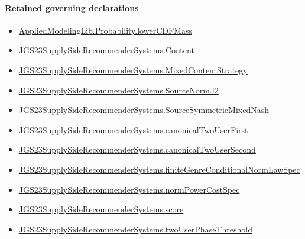\documentclass[10pt]{article}
\begin{document}
\paragraph{Retained governing declarations}
\begin{itemize}\raggedright
\item \hyperlink{governing-declaration-5dfc240c860659bf}{Applied\allowbreak{}Modeling\allowbreak{}Lib.\allowbreak{}Probability.\allowbreak{}lower\allowbreak{}CDF\allowbreak{}Mass}
\item \hyperlink{governing-declaration-367305fda50f0ada}{JGS23\allowbreak{}Supply\allowbreak{}Side\allowbreak{}Recommender\allowbreak{}Systems.\allowbreak{}Content}
\item \hyperlink{governing-declaration-2089965d06cf0282}{JGS23\allowbreak{}Supply\allowbreak{}Side\allowbreak{}Recommender\allowbreak{}Systems.\allowbreak{}Mixed\allowbreak{}Content\allowbreak{}Strategy}
\item \hyperlink{governing-declaration-9299663ffe3ecb38}{JGS23\allowbreak{}Supply\allowbreak{}Side\allowbreak{}Recommender\allowbreak{}Systems.\allowbreak{}Source\allowbreak{}Norm.\allowbreak{}l2}
\item \hyperlink{governing-declaration-8919e7334fa5ab60}{JGS23\allowbreak{}Supply\allowbreak{}Side\allowbreak{}Recommender\allowbreak{}Systems.\allowbreak{}Source\allowbreak{}Symmetric\allowbreak{}Mixed\allowbreak{}Nash}
\item \hyperlink{governing-declaration-abb7b5a1ce6f14ba}{JGS23\allowbreak{}Supply\allowbreak{}Side\allowbreak{}Recommender\allowbreak{}Systems.\allowbreak{}canonical\allowbreak{}Two\allowbreak{}User\allowbreak{}First}
\item \hyperlink{governing-declaration-fb292a037babdd07}{JGS23\allowbreak{}Supply\allowbreak{}Side\allowbreak{}Recommender\allowbreak{}Systems.\allowbreak{}canonical\allowbreak{}Two\allowbreak{}User\allowbreak{}Second}
\item \hyperlink{governing-declaration-2af2354c1c8f624e}{JGS23\allowbreak{}Supply\allowbreak{}Side\allowbreak{}Recommender\allowbreak{}Systems.\allowbreak{}finite\allowbreak{}Genre\allowbreak{}Conditional\allowbreak{}Norm\allowbreak{}Law\allowbreak{}Spec}
\item \hyperlink{governing-declaration-6ba13dc1cae95e6e}{JGS23\allowbreak{}Supply\allowbreak{}Side\allowbreak{}Recommender\allowbreak{}Systems.\allowbreak{}norm\allowbreak{}Power\allowbreak{}Cost\allowbreak{}Spec}
\item \hyperlink{governing-declaration-e3725af4eb21c4db}{JGS23\allowbreak{}Supply\allowbreak{}Side\allowbreak{}Recommender\allowbreak{}Systems.\allowbreak{}score}
\item \hyperlink{governing-declaration-63bdc0df0d11c740}{JGS23\allowbreak{}Supply\allowbreak{}Side\allowbreak{}Recommender\allowbreak{}Systems.\allowbreak{}two\allowbreak{}User\allowbreak{}Phase\allowbreak{}Threshold}
\end{itemize}
\end{document}
